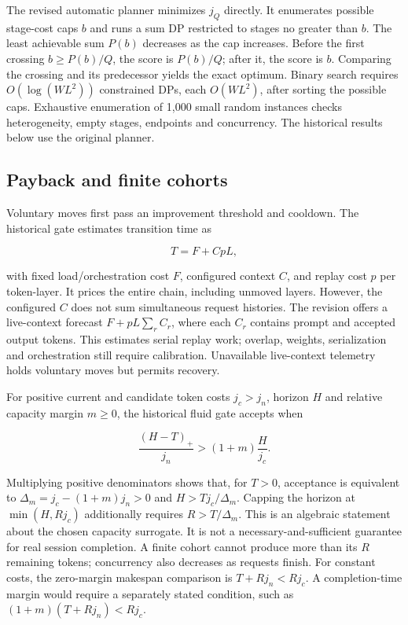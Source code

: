 \documentclass[conference]{IEEEtran}
\begin{document}
The revised automatic planner minimizes \(j_Q\) directly. It enumerates
possible stage-cost caps \(b\) and runs a sum DP restricted to stages no
greater than \(b\). The least achievable sum \(P(b)\) decreases as the
cap increases. Before the first crossing \(b\ge P(b)/Q\), the score is
\(P(b)/Q\); after it, the score is \(b\). Comparing the crossing and its
predecessor yields the exact optimum. Binary search requires
\(O(\log(WL^2))\) constrained DPs, each \(O(WL^2)\), after sorting the
possible caps. Exhaustive enumeration of 1,000 small random instances
checks heterogeneity, empty stages, endpoints and concurrency. The
historical results below use the original planner.

\hypertarget{payback-and-finite-cohorts}{%
\subsection{Payback and finite
cohorts}\label{payback-and-finite-cohorts}}

Voluntary moves first pass an improvement threshold and cooldown. The
historical gate estimates transition time as

\[T=F+CpL, \tag{3}\]

with fixed load/orchestration cost \(F\), configured context \(C\), and
replay cost \(p\) per token-layer. It prices the entire chain, including
unmoved layers. However, the configured \(C\) does not sum simultaneous
request histories. The revision offers a live-context forecast
\(F+pL\sum_r C_r\), where each \(C_r\) contains prompt and accepted
output tokens. This estimates serial replay work; overlap, weights,
serialization and orchestration still require calibration. Unavailable
live-context telemetry holds voluntary moves but permits recovery.

For positive current and candidate token costs \(j_c>j_n\), horizon
\(H\) and relative capacity margin \(m\ge0\), the historical fluid gate
accepts when

\[\frac{(H-T)_+}{j_n}>(1+m)\frac{H}{j_c}. \tag{4}\]

Multiplying positive denominators shows that, for \(T>0\), acceptance is
equivalent to \(\Delta_m=j_c-(1+m)j_n>0\) and \(H>Tj_c/\Delta_m\).
Capping the horizon at \(\min(H,Rj_c)\) additionally requires
\(R>T/\Delta_m\). This is an algebraic statement about the chosen
capacity surrogate. It is not a necessary-and-sufficient guarantee for
real session completion. A finite cohort cannot produce more than its
\(R\) remaining tokens; concurrency also decreases as requests finish.
For constant costs, the zero-margin makespan comparison is
\(T+Rj_n<Rj_c\). A completion-time margin would require a separately
stated condition, such as \((1+m)(T+Rj_n)<Rj_c\).
\end{document}
